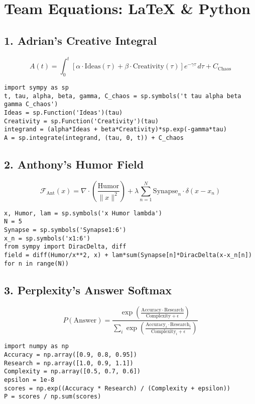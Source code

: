 \documentclass[12pt]{article}
\begin{document}
\section*{Team Equations: LaTeX \& Python}

\subsection*{1. Adrian's Creative Integral}
\[
A(t) = \int_{0}^{t} \left[ \alpha \cdot \mathrm{Ideas}(\tau) + \beta \cdot \mathrm{Creativity}(\tau) \right] e^{-\gamma \tau} \, d\tau + C_{\text{Chaos}}
\]
\begin{lstlisting}
import sympy as sp
t, tau, alpha, beta, gamma, C_chaos = sp.symbols('t tau alpha beta gamma C_chaos')
Ideas = sp.Function('Ideas')(tau)
Creativity = sp.Function('Creativity')(tau)
integrand = (alpha*Ideas + beta*Creativity)*sp.exp(-gamma*tau)
A = sp.integrate(integrand, (tau, 0, t)) + C_chaos
\end{lstlisting}

\subsection*{2. Anthony's Humor Field}
\[
\mathcal{F}_{\text{Ant}}(x) = \nabla \cdot \left( \frac{\mathrm{Humor}}{\|x\|^2} \right) + \lambda \sum_{n=1}^{N} \mathrm{Synapse}_n \cdot \delta(x - x_n)
\]
\begin{lstlisting}
x, Humor, lam = sp.symbols('x Humor lambda')
N = 5
Synapse = sp.symbols('Synapse1:6')
x_n = sp.symbols('x1:6')
from sympy import DiracDelta, diff
field = diff(Humor/x**2, x) + lam*sum(Synapse[n]*DiracDelta(x-x_n[n]) for n in range(N))
\end{lstlisting}

\subsection*{3. Perplexity's Answer Softmax}
\[
P(\mathrm{Answer}) = \frac{\exp\left(\frac{\mathrm{Accuracy} \cdot \mathrm{Research}}{\mathrm{Complexity} + \epsilon}\right)}{\sum_{i} \exp\left(\frac{\mathrm{Accuracy}_i \cdot \mathrm{Research}_i}{\mathrm{Complexity}_i + \epsilon}\right)}
\]
\begin{lstlisting}
import numpy as np
Accuracy = np.array([0.9, 0.8, 0.95])
Research = np.array([1.0, 0.9, 1.1])
Complexity = np.array([0.5, 0.7, 0.6])
epsilon = 1e-8
scores = np.exp((Accuracy * Research) / (Complexity + epsilon))
P = scores / np.sum(scores)
\end{lstlisting}
\end{document}
